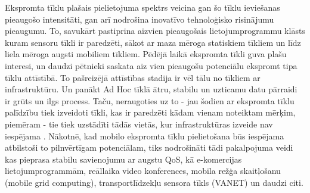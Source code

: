 Ekspromta tīklu plašais pielietojuma spektrs veicina gan šo tīklu ieviešanas pieaugošo intensitāti, gan arī nodrošina inovatīvo tehnoloģisko risinājumu pieaugumu. To, savukārt pastiprina aizvien pieaugošais lietojumprogrammu klāsts kuram sensoru tīkli ir paredzēti, sākot ar maza mēroga statiskiem tīkliem un līdz liela mēroga augsti mobiliem tīkliem. Pēdējā laikā ekspromta tīkli guva plašu interesi, un daudzi pētnieki saskata aiz vien pieaugošu potenciālu ekspromt tipa tīklu attīstībā. To pašreizējā attīstības stadija ir vēl tālu no tīkliem ar infrastruktūru. Un panākt Ad Hoc tīklā ātru, stabilu un uzticamu datu pārraidi ir grūts un ilgs process.
Taču, neraugoties uz to - jau šodien ar ekspromta tīklu palīdzību tiek izveidoti tīkli, kas ir paredzēti kādam vienam noteiktam mērķim, piemēram - tie tiek uzstādīti tādās vietās, kur infrastruktūras izveide nav iespējama \cite{self_manag}. Nākotnē, kad mobilo ekspromta tīklu pielietošana būs iespējama atbilstoši to pilnvērtīgam potenciālam, tiks nodrošināti tādi pakalpojuma veidi kas pieprasa stabilu savienojumu ar augstu \ac{QoS}, kā e-komercijas lietojumprogrammām, reāllaika video konferences, mobila režģa skaitļošanu (mobile grid computing), transportlīdzekļu sensora tīkls (\acs{VANET}) un daudzi citi.


